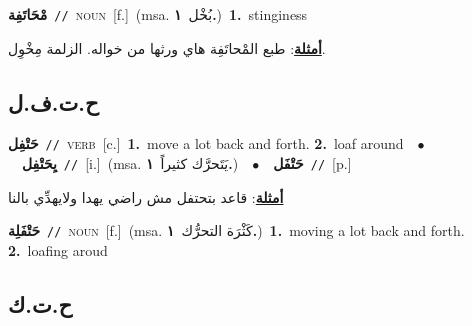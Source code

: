 \documentclass[10pt,a4paper,twoside]{article} %
\begin{document}
\begin{multicols}{2}
{{{{{{{{{\setlength\topsep{0pt}\textbf{\foreignlanguage{arabic}{مْحَاتَفِة}}\ {\color{gray}\texttt{//}\color{black}}\ \textsc{noun}\ [f.]\ \color{gray}(msa. \foreignlanguage{arabic}{بُخْل}~\foreignlanguage{arabic}{\textbf{١.}})\color{black}\ \textbf{1.}~stinginess\  \begin{flushright}\color{gray}\foreignlanguage{arabic}{\textbf{\underline{\foreignlanguage{arabic}{أمثلة}}}: طبع المْحاتَفِة هاي ورثها من خواله. الزلمة مِخْوِل.}\end{flushright}\color{black}} \vspace{2mm}

\vspace{-3mm}
\subsection*{\color{blue}\foreignlanguage{arabic}{ح.ت.ف.ل}\color{blue}{}} 

{\setlength\topsep{0pt}\textbf{\foreignlanguage{arabic}{حَتْفِل}}\ {\color{gray}\texttt{//}\color{black}}\ \textsc{verb}\ [c.]\ \textbf{1.}~move a lot back and forth.  \textbf{2.}~loaf around\ \ $\bullet$\ \ \setlength\topsep{0pt}\textbf{\foreignlanguage{arabic}{يِحَتْفِل}}\ {\color{gray}\texttt{//}\color{black}}\ [i.]\ \color{gray}(msa. \foreignlanguage{arabic}{يَتَحرَّك كثيراً}~\foreignlanguage{arabic}{\textbf{١.}})\color{black}\ \ $\bullet$\ \ \setlength\topsep{0pt}\textbf{\foreignlanguage{arabic}{حَتْفَل}}\ {\color{gray}\texttt{//}\color{black}}\ [p.]\  \begin{flushright}\color{gray}\foreignlanguage{arabic}{\textbf{\underline{\foreignlanguage{arabic}{أمثلة}}}: قاعد بتحتفل مش راضي يهدا ولايهدِّي بالنا}\end{flushright}\color{black}} \vspace{2mm}

{\setlength\topsep{0pt}\textbf{\foreignlanguage{arabic}{حَتْفَلِة}}\ {\color{gray}\texttt{//}\color{black}}\ \textsc{noun}\ [f.]\ \color{gray}(msa. \foreignlanguage{arabic}{كَثْرَة التحرُّك}~\foreignlanguage{arabic}{\textbf{١.}})\color{black}\ \textbf{1.}~moving a lot back and forth.  \textbf{2.}~loafing aroud\ 

\vspace{-3mm}
\subsection*{\color{blue}\foreignlanguage{arabic}{ح.ت.ك}\color{blue}{}} 

}}}}}}}}}
\end{multicols}
\end{document}
